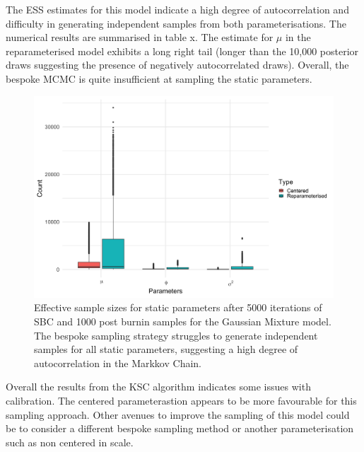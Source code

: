\documentclass[12pt, a4paper]{article}
\begin{document}
    The ESS estimates for this model indicate a high degree of autocorrelation and difficulty in generating independent samples from both parameterisations. The numerical results are summarised in table x. The estimate for $\mu$ in the reparameterised model exhibits a long right tail (longer than the 10,000 posterior draws suggesting the presence of negatively autocorrelated draws). Overall, the bespoke MCMC is quite insufficient at sampling the static parameters. 
    


    \begin{figure}[H]
        \centering
        \includegraphics[scale=0.1]{results/ksc_ess.png}
        \caption{Effective sample sizes for static parameters after 5000 iterations of SBC and 1000 post burnin samples for the Gaussian Mixture model. The bespoke sampling strategy struggles to generate independent samples for all static parameters, suggesting a high degree of autocorrelation in the Markkov Chain.}
        \label{fig:kscess}
    \end{figure}

    Overall the results from the KSC algorithm indicates some issues with calibration. The centered parameterastion appears to be more favourable for this sampling approach. Other avenues to improve the sampling of this model could be to consider a different bespoke sampling method or another parameterisation such as non centered in scale.
\end{document}
